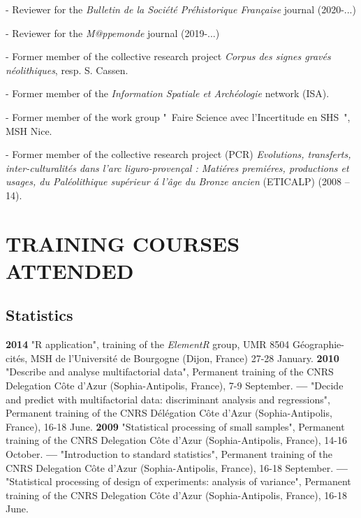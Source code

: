 \documentclass[11pt]{report} %
\begin{document}
-  Reviewer for the \textit{Bulletin de la Soci\'{e}t\'{e} Pr\'{e}historique Fran\c{c}aise} journal (2020-...)

-  Reviewer for the \textit{M@ppemonde} journal (2019-...)

-  Former member of the collective research project \textit{Corpus des signes grav\'{e}s n\'{e}olithiques}, resp. S. Cassen.

-  Former member of the \textit{Information Spatiale et Arch\'{e}ologie} network (ISA). 

-  Former member of the work group "~Faire Science avec l'Incertitude en SHS~", MSH Nice.

-  Former member of the collective research project (PCR) \textit{Evolutions, transferts, inter-culturalit\'{e}s dans l'arc liguro-proven\c{c}al : Mati\'{e}res premi\'{e}res, productions et usages, du Pal\'{e}olithique sup\'{e}rieur \'{a} l'\^{a}ge du Bronze ancien} (ETICALP) (2008 -- 14).

\section*{TRAINING COURSES ATTENDED}

\subsection*{Statistics }

\textbf{2014 }"R application", training of the \textit{ElementR} group, UMR 8504 G\'{e}ographie-cit\'{e}s, MSH de l'Universit\'{e} de Bourgogne (Dijon, France) 27-28 January.
\smallbreak
\textbf{2010 }"Describe and analyse multifactorial data", Permanent training of the CNRS Delegation C\^{o}te d'Azur (Sophia-Antipolis, France), 7-9 September.
\smallbreak
\textbf{---  }"Decide and predict with multifactorial data: discriminant analysis and regressions", Permanent training of the CNRS D\'{e}l\'{e}gation C\^{o}te d'Azur (Sophia-Antipolis, France), 16-18 June.
\smallbreak
\textbf{2009 }"Statistical processing of small samples", Permanent training of the CNRS Delegation C\^{o}te d'Azur (Sophia-Antipolis, France), 14-16 October.
\smallbreak
\textbf{---  }"Introduction to standard statistics", Permanent training of the CNRS Delegation C\^{o}te d'Azur (Sophia-Antipolis, France), 16-18 September.
\textbf{---  }"Statistical processing of design of experiments: analysis of variance", Permanent training of the CNRS Delegation C\^{o}te d'Azur (Sophia-Antipolis, France), 16-18 June.
\smallbreak
\end{document}

